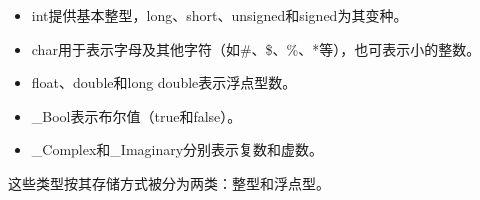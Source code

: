 \begin{frame}
\begin{itemize}
\item 
int提供基本整型，long、short、unsigned和signed为其变种。\\[0.1in]
\item
char用于表示字母及其他字符（如\#、\$、\%、*等），也可表示小的整数。\\[0.1in]
\item
float、double和long double表示浮点型数。\\[0.1in]
\item \_Bool表示布尔值（true和false）。\\[0.1in]
\item \_Complex和\_Imaginary分别表示复数和虚数。\\[0.2in]
\end{itemize}
\textcolor{acolor1}{这些类型按其存储方式被分为两类：整型和浮点型。}
\end{frame}





